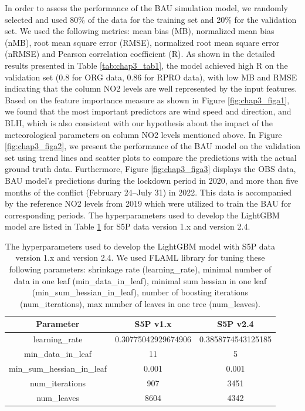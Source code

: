 In order to assess the performance of the BAU simulation model, we randomly selected and used 80\% of the data for the training set and 20\% for the validation set. We used the following metrics: mean bias (MB), normalized mean bias (nMB), root mean square error (RMSE), normalized root mean square error (nRMSE) and Pearson correlation coefficient (R). As shown in the detailed results presented in Table \ref{tab:chap3_tab1}, the model achieved high R on the validation set (0.8 for ORG data, 0.86 for RPRO data), with low MB and RMSE indicating that the column NO2 levels are well represented by the input features. Based on the feature importance measure as shown in Figure \ref{fig:chap3_figa1}, we found that the most important predictors are wind speed and direction, and BLH, which is also consistent with our hypothesis about the impact of the meteorological parameters on column NO2 levels mentioned above. In Figure \ref{fig:chap3_figa2}, we present the performance of the BAU model on the validation set using trend lines and scatter plots to compare the predictions with the actual ground truth data. Furthermore, Figure \ref{fig:chap3_figa3} displays the OBS data, BAU model’s predictions during the lockdown period in 2020, and more than five months of the conflict (February 24–July 31) in 2022. This data is accompanied by the reference NO2 levels from 2019 which were utilized to train the BAU for corresponding periods. The hyperparameters used to develop the LightGBM model are listed in Table \ref{tab:chap3_taba1} for S5P data version 1.x and version 2.4. \par

\begin{table}[tbh!]
    \centering
    \caption[The hyperparameters used to develop the LightGBM model]{The hyperparameters used to develop the LightGBM model with S5P data version 1.x and version 2.4. We used FLAML library \citep{wang2021flaml} for tuning these following parameters: shrinkage rate (learning\_rate), minimal number of data in one leaf (min\_data\_in\_leaf), minimal sum hessian in one leaf (min\_sum\_hessian\_in\_leaf), number of boosting iterations (num\_iterations), max number of leaves in one tree (num\_leaves).}
    \begin{tabular}{c c c}
        \hline
            Parameter & S5P v1.x & S5P v2.4  \\ \hline
            learning\_rate & 0.30775042929674906 & 0.3858774543125185  \\
            min\_data\_in\_leaf & 11 & 5  \\
            min\_sum\_hessian\_in\_leaf & 0.001 & 0.001  \\
            num\_iterations & 907 & 3451  \\
            num\_leaves & 8604 & 4342  \\ \hline
    \end{tabular}
    \label{tab:chap3_taba1}

\end{table}

